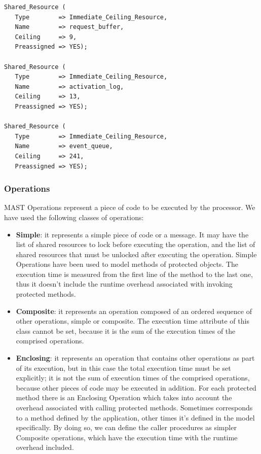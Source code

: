 \documentclass{article}
\begin{document}
\begin{lstlisting}
Shared_Resource (
   Type        => Immediate_Ceiling_Resource,
   Name        => request_buffer,
   Ceiling     => 9,
   Preassigned => YES);

Shared_Resource (
   Type        => Immediate_Ceiling_Resource,
   Name        => activation_log,
   Ceiling     => 13,
   Preassigned => YES);

Shared_Resource (
   Type        => Immediate_Ceiling_Resource,
   Name        => event_queue,
   Ceiling     => 241,
   Preassigned => YES);
\end{lstlisting}

\subsubsection{Operations}

MAST Operations represent a piece of code to be executed by the processor. We have used the following classes of operations:

\begin{itemize}
   \item \textbf{Simple}: it represents a simple piece of code or a message. It may have the list of shared resources to lock before executing the operation, and the list of shared resources that must be unlocked after executing the operation. Simple Operations have been used to model methods of protected objects. The execution time is measured from the first line of the method to the last one, thus it doesn't include the runtime overhead associated with invoking protected methods.
   \item \textbf{Composite}: it represents an operation composed of an ordered sequence of other operations, simple or composite. The execution time attribute of this class cannot be set, because it is the sum of the execution times of the comprised operations.
   \item \textbf{Enclosing}: it represents an operation that contains other operations as part of its execution, but in this case the total execution time must be set explicitly; it is not the sum of execution times of the comprised operations, because other pieces of code may be executed in addition. For each protected method there is an Enclosing Operation which takes into account the overhead associated with calling protected methods. Sometimes corresponds to a method defined by the application, other times it's defined in the model specifically. By doing so, we can define the caller procedures as simpler Composite operations, which have the execution time with the runtime overhead included.
\end{itemize}
\end{document}
